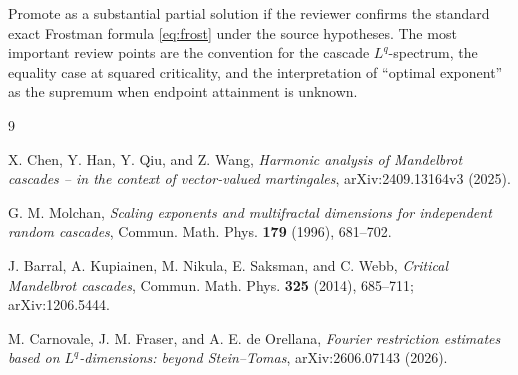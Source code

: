 \documentclass[11pt]{article}
\begin{document}
Promote as a substantial partial solution if the reviewer confirms the
standard exact Frostman formula \eqref{eq:frost} under the source hypotheses.
The most important review points are the convention for the cascade
\(L^q\)-spectrum, the equality case at squared criticality, and the
interpretation of ``optimal exponent'' as the supremum when endpoint
attainment is unknown.

\begin{thebibliography}{9}

X. Chen, Y. Han, Y. Qiu, and Z. Wang,
\emph{Harmonic analysis of Mandelbrot cascades -- in the context of
vector-valued martingales},
arXiv:2409.13164v3 (2025).

G. M. Molchan,
\emph{Scaling exponents and multifractal dimensions for independent random
cascades},
Commun. Math. Phys. \textbf{179} (1996), 681--702.

J. Barral, A. Kupiainen, M. Nikula, E. Saksman, and C. Webb,
\emph{Critical Mandelbrot cascades},
Commun. Math. Phys. \textbf{325} (2014), 685--711;
arXiv:1206.5444.

M. Carnovale, J. M. Fraser, and A. E. de Orellana,
\emph{Fourier restriction estimates based on \(L^q\)-dimensions: beyond
Stein--Tomas},
arXiv:2606.07143 (2026).

\end{thebibliography}
\end{document}
